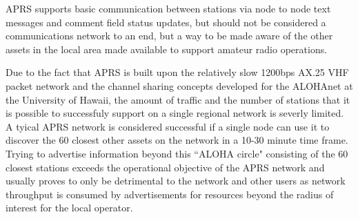 APRS supports basic communication between stations via node to node 
text messages and comment field status updates, but should not be 
considered a communications network to an end, but a way to be made aware
of the other assets in the local area made available to support amateur 
radio operations.

Due to the fact that APRS is built upon the relatively slow 
1200bps AX.25 VHF packet
network and the channel sharing concepts developed for the ALOHAnet at
the University of Hawaii, the amount of 
traffic and the number of stations that it is possible to successfuly 
support on a single regional network is severly limited. 
A tyical APRS network is considered successful if a single node
can use it to discover the 60 closest other assets on the network in a
10-30 minute time frame. Trying to advertise information beyond this
``ALOHA circle" consisting of the 60 closest stations exceeds the 
operational objective of the APRS network and usually proves to only be 
detrimental to the network and other users as network throughput is 
consumed by advertisements for 
resources beyond the radius of interest for the local operator.

